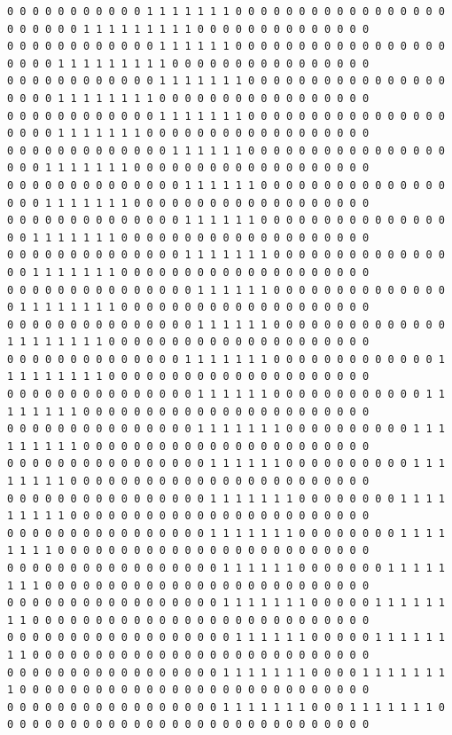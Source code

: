 \documentclass{oci}
\begin{document}
\begin{sampleDescription}
{\begin{verbatim}
0 0 0 0 0 0 0 0 0 0 0 1 1 1 1 1 1 1 0 0 0 0 0 0 0 0 0 0 0 0 0 0 0 0 0 0 0 0 0 0 0 1 1 1 1 1 1 1 1 1 0 0 0 0 0 0 0 0 0 0 0 0 0 0
0 0 0 0 0 0 0 0 0 0 0 0 1 1 1 1 1 1 0 0 0 0 0 0 0 0 0 0 0 0 0 0 0 0 0 0 0 0 0 1 1 1 1 1 1 1 1 1 0 0 0 0 0 0 0 0 0 0 0 0 0 0 0 0
0 0 0 0 0 0 0 0 0 0 0 0 1 1 1 1 1 1 1 0 0 0 0 0 0 0 0 0 0 0 0 0 0 0 0 0 0 0 0 1 1 1 1 1 1 1 1 0 0 0 0 0 0 0 0 0 0 0 0 0 0 0 0 0
0 0 0 0 0 0 0 0 0 0 0 0 1 1 1 1 1 1 1 0 0 0 0 0 0 0 0 0 0 0 0 0 0 0 0 0 0 0 0 1 1 1 1 1 1 1 0 0 0 0 0 0 0 0 0 0 0 0 0 0 0 0 0 0
0 0 0 0 0 0 0 0 0 0 0 0 0 1 1 1 1 1 1 0 0 0 0 0 0 0 0 0 0 0 0 0 0 0 0 0 0 0 1 1 1 1 1 1 1 0 0 0 0 0 0 0 0 0 0 0 0 0 0 0 0 0 0 0
0 0 0 0 0 0 0 0 0 0 0 0 0 0 1 1 1 1 1 1 0 0 0 0 0 0 0 0 0 0 0 0 0 0 0 0 0 0 1 1 1 1 1 1 1 0 0 0 0 0 0 0 0 0 0 0 0 0 0 0 0 0 0 0
0 0 0 0 0 0 0 0 0 0 0 0 0 0 1 1 1 1 1 1 0 0 0 0 0 0 0 0 0 0 0 0 0 0 0 0 0 1 1 1 1 1 1 1 0 0 0 0 0 0 0 0 0 0 0 0 0 0 0 0 0 0 0 0
0 0 0 0 0 0 0 0 0 0 0 0 0 0 1 1 1 1 1 1 1 0 0 0 0 0 0 0 0 0 0 0 0 0 0 0 0 1 1 1 1 1 1 1 0 0 0 0 0 0 0 0 0 0 0 0 0 0 0 0 0 0 0 0
0 0 0 0 0 0 0 0 0 0 0 0 0 0 0 1 1 1 1 1 1 0 0 0 0 0 0 0 0 0 0 0 0 0 0 0 1 1 1 1 1 1 1 1 0 0 0 0 0 0 0 0 0 0 0 0 0 0 0 0 0 0 0 0
0 0 0 0 0 0 0 0 0 0 0 0 0 0 0 1 1 1 1 1 1 0 0 0 0 0 0 0 0 0 0 0 0 0 0 1 1 1 1 1 1 1 1 0 0 0 0 0 0 0 0 0 0 0 0 0 0 0 0 0 0 0 0 0
0 0 0 0 0 0 0 0 0 0 0 0 0 0 1 1 1 1 1 1 1 0 0 0 0 0 0 0 0 0 0 0 0 0 1 1 1 1 1 1 1 1 1 0 0 0 0 0 0 0 0 0 0 0 0 0 0 0 0 0 0 0 0 0
0 0 0 0 0 0 0 0 0 0 0 0 0 0 0 1 1 1 1 1 1 0 0 0 0 0 0 0 0 0 0 0 0 1 1 1 1 1 1 1 1 0 0 0 0 0 0 0 0 0 0 0 0 0 0 0 0 0 0 0 0 0 0 0
0 0 0 0 0 0 0 0 0 0 0 0 0 0 0 1 1 1 1 1 1 1 0 0 0 0 0 0 0 0 0 0 1 1 1 1 1 1 1 1 1 0 0 0 0 0 0 0 0 0 0 0 0 0 0 0 0 0 0 0 0 0 0 0
0 0 0 0 0 0 0 0 0 0 0 0 0 0 0 0 1 1 1 1 1 1 0 0 0 0 0 0 0 0 0 0 1 1 1 1 1 1 1 1 0 0 0 0 0 0 0 0 0 0 0 0 0 0 0 0 0 0 0 0 0 0 0 0
0 0 0 0 0 0 0 0 0 0 0 0 0 0 0 0 1 1 1 1 1 1 1 0 0 0 0 0 0 0 0 1 1 1 1 1 1 1 1 1 0 0 0 0 0 0 0 0 0 0 0 0 0 0 0 0 0 0 0 0 0 0 0 0
0 0 0 0 0 0 0 0 0 0 0 0 0 0 0 0 1 1 1 1 1 1 1 0 0 0 0 0 0 0 0 1 1 1 1 1 1 1 1 0 0 0 0 0 0 0 0 0 0 0 0 0 0 0 0 0 0 0 0 0 0 0 0 0
0 0 0 0 0 0 0 0 0 0 0 0 0 0 0 0 0 1 1 1 1 1 1 0 0 0 0 0 0 0 1 1 1 1 1 1 1 1 0 0 0 0 0 0 0 0 0 0 0 0 0 0 0 0 0 0 0 0 0 0 0 0 0 0
0 0 0 0 0 0 0 0 0 0 0 0 0 0 0 0 0 1 1 1 1 1 1 1 0 0 0 0 0 1 1 1 1 1 1 1 1 0 0 0 0 0 0 0 0 0 0 0 0 0 0 0 0 0 0 0 0 0 0 0 0 0 0 0
0 0 0 0 0 0 0 0 0 0 0 0 0 0 0 0 0 0 1 1 1 1 1 1 0 0 0 0 0 1 1 1 1 1 1 1 1 0 0 0 0 0 0 0 0 0 0 0 0 0 0 0 0 0 0 0 0 0 0 0 0 0 0 0
0 0 0 0 0 0 0 0 0 0 0 0 0 0 0 0 0 1 1 1 1 1 1 1 0 0 0 0 1 1 1 1 1 1 1 1 0 0 0 0 0 0 0 0 0 0 0 0 0 0 0 0 0 0 0 0 0 0 0 0 0 0 0 0
0 0 0 0 0 0 0 0 0 0 0 0 0 0 0 0 0 1 1 1 1 1 1 1 0 0 0 1 1 1 1 1 1 1 0 0 0 0 0 0 0 0 0 0 0 0 0 0 0 0 0 0 0 0 0 0 0 0 0 0 0 0 0 0

\end{verbatim}}
\end{sampleDescription}
\end{document}
